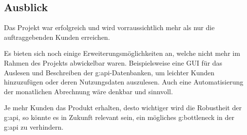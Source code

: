 \subsection{Ausblick}
Das Projekt war erfolgreich und wird vorraussichtlich mehr als nur die auftraggebenden Kunden erreichen.

Es bieten sich noch einige Erweiterungsmöglichkeiten an, welche nicht mehr im Rahmen des Projekts abwickelbar waren. 
Beispielsweise eine GUI für das Auslesen und Beschreiben der \gls{g:api}-Datenbanken, um leichter Kunden hinzuzufügen oder deren Nutzungsdaten auszulesen.
Auch eine Automatisierung der monatlichen Abrechnung wäre denkbar und sinnvoll.

Je mehr Kunden das Produkt erhalten, desto wichtiger wird die Robustheit der \gls{g:api}, so könnte es in Zukunft relevant sein, ein mögliches \gls{g:bottleneck} in der \gls{g:api} zu verhindern.